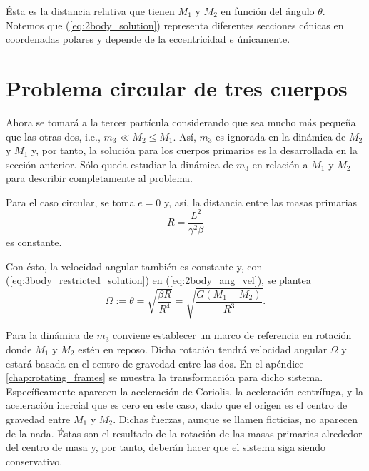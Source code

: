 Ésta es la distancia relativa que tienen $M_1$ y $M_2$ en función del ángulo $\theta$. Notemos que (\ref{eq:2body_solution}) representa diferentes secciones cónicas en coordenadas polares y depende de la eccentricidad $e$ únicamente.

\section{Problema circular de tres cuerpos}
\label{sec:R3BP}

Ahora se tomará a la tercer partícula considerando que sea mucho más pequeña que las otras dos, i.e., $m_3 \ll M_2 \leq M_1$. Así, $m_3$ es ignorada en la dinámica de $M_2$ y $M_1$ y, por tanto, la solución para los cuerpos primarios es la desarrollada en la sección anterior. Sólo queda estudiar la dinámica de $m_3$ en relación a $M_1$ y $M_2$ para describir completamente al problema.

Para el caso circular, se toma $e = 0$ y, así, la distancia entre las masas primarias
\begin{equation}
 R = \frac{L^2}{\gamma^2 \beta}
 \label{eq:3body_restricted_solution}
\end{equation} 
es constante.

Con ésto, la velocidad angular también es constante y, con (\ref{eq:3body_restricted_solution}) en (\ref{eq:2body_ang_vel}), se plantea
\begin{equation}
 \Omega := \dot{\theta} = \sqrt{ \frac{\beta R}{R^4} } = \sqrt{\frac{G \left(M_1 + M_2 \right)}{R^3}}.
 \label{eq:3body_ang_velocity}
\end{equation}

Para la dinámica de $m_3$ conviene establecer un marco de referencia en rotación donde $M_1$ y $M_2$ estén en reposo. Dicha rotación tendrá velocidad angular $\Omega$ y estará basada en el centro de gravedad entre las dos. En el apéndice \ref{chap:rotating_frames} se muestra la transformación para dicho sistema. Específicamente aparecen la aceleración de Coriolis, la aceleración centrífuga, y la aceleración inercial que es cero en este caso, dado que el origen es el centro de gravedad entre $M_1$ y $M_2$. Dichas fuerzas, aunque se llamen ficticias, no aparecen de la nada. Éstas son el resultado de la rotación de las masas primarias alrededor del centro de masa y, por tanto, deberán hacer que el sistema siga siendo conservativo. 



